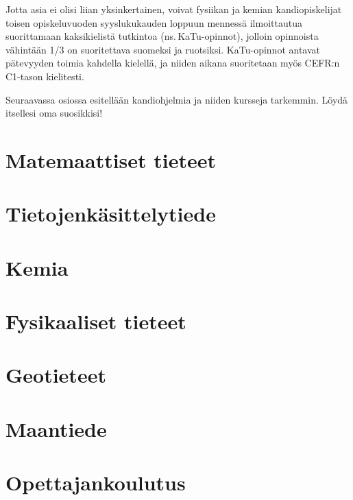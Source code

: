 \documentclass[a5paper, 8pt, twocolumn]{book} %
\numberwithin{equation}{section}
\begin{document}
Jotta asia ei olisi liian yksinkertainen, voivat fysiikan ja kemian kandiopiskelijat toisen opiskeluvuoden syyslukukauden loppuun mennessä ilmoittautua suorittamaan kaksikielistä tutkintoa (ns.\,KaTu-opinnot), jolloin opinnoista vähintään 1/3 on suoritettava suomeksi ja ruotsiksi. KaTu-opinnot antavat pätevyyden toimia kahdella kielellä, ja niiden aikana suoritetaan myös CEFR:n C1-tason kielitesti.

Seuraavassa osiossa esitellään kandiohjelmia ja niiden kursseja tarkemmin. Löydä itsellesi oma suosikkisi!

\chapter{Matemaattiset tieteet}


\chapter{Tietojenkäsittelytiede}


\chapter{Kemia}


\chapter{Fysikaaliset tieteet}


\chapter{Geotieteet}


\chapter{Maantiede}


\chapter{Opettajankoulutus}

\end{document}
